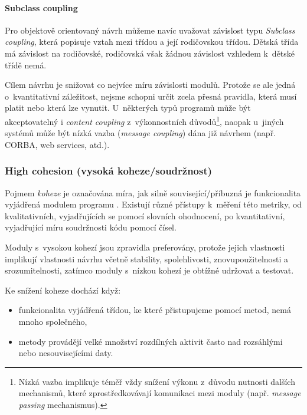 \vspace{0.5cm}

\paragraph{Subclass coupling} Pro objektově orientovaný návrh můžeme navíc uvažovat závislost typu \emph{Subclass coupling}, která popisuje vztah mezi třídou a její rodičovskou třídou. Dětská třída má závislost na rodičovské, rodičovská však žádnou závislost vzhledem k~dětské třídě nemá.

\vspace{1.0cm}

Cílem návrhu je snižovat co nejvíce míru závislosti modulů. Protože se ale jedná o~kvantitativní záležitost, nejsme schopni určit zcela přesná pravidla, která musí platit nebo která lze vynutit. U~některých typů programů může být akceptovatelný i \emph{content coupling} z~výkonnostních důvodů\footnote{Nízká vazba implikuje téměř vždy snížení výkonu z~důvodu nutnosti dalších mechanismů, které zprostředkovávají komunikaci mezi moduly (např. \emph{message passing} mechanismus).}, naopak u~jiných systémů může být nízká vazba (\emph{message coupling}) dána již návrhem (např. CORBA, web services, atd.).

\subsubsection{High cohesion (vysoká koheze/soudržnost)}
Pojmem \emph{koheze} je označována míra, jak silně související/příbuzná je funkcionalita vyjádřená modulem programu \cite{wiki:cohesion}. Existují různé přístupy k~měření této metriky, od kvalitativních, vyjadřujících se pomocí slovních ohodnocení, po kvantitativní, vyjadřující míru soudržnosti kódu pomocí čísel.

Moduly s~vysokou kohezí jsou zpravidla preferovány, protože jejich vlastnosti implikují  vlastnosti návrhu včetně stability, spolehlivosti, znovupoužitelnosti a srozumitelnosti, zatímco moduly s~nízkou kohezí je obtížné udržovat a testovat.

Ke snížení koheze dochází když:
\begin{itemize}
\item funkcionalita vyjádřená třídou, ke které přistupujeme pomocí metod, nemá mnoho společného,
\item metody provádějí velké množství rozdílných aktivit často nad rozsáhlými nebo nesouvisejícími daty.
\end{itemize}

